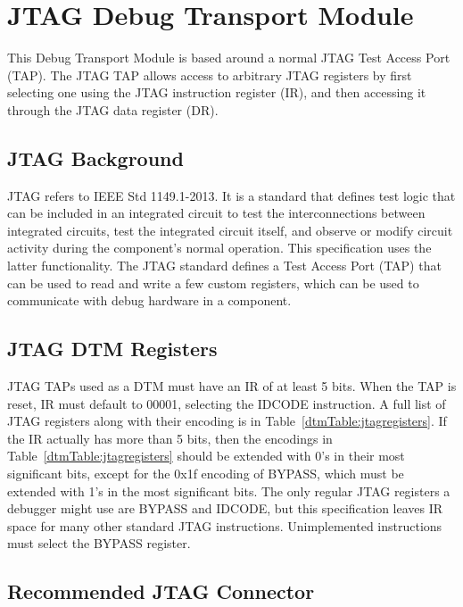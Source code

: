 \section{JTAG Debug Transport Module} \label{sec:jtagdtm}

This Debug Transport Module is based around a normal JTAG Test Access Port
(TAP).  The JTAG TAP allows access to arbitrary JTAG registers by first
selecting one using the JTAG instruction register (IR), and then accessing it
through the JTAG data register (DR).

\subsection{JTAG Background}

JTAG refers to IEEE Std 1149.1-2013. It is a standard that defines test logic
that can be included in an integrated circuit to test the interconnections
between integrated circuits, test the integrated circuit itself, and observe or
modify circuit activity during the component’s normal operation.
This specification uses the latter functionality.
The JTAG standard defines a Test Access Port (TAP) that
can be used to read and write a few custom registers, which can be used to
communicate with debug hardware in a component.

\subsection{JTAG DTM Registers}

JTAG TAPs used as a DTM must have an IR of at least 5 bits.
When the TAP is reset, IR must default to
00001, selecting the IDCODE instruction. A full list of JTAG registers along
with their encoding is in Table~\ref{dtmTable:jtagregisters}.
If the IR actually has more than 5 bits, then the encodings in
Table~\ref{dtmTable:jtagregisters} should be extended with 0's in their most
significant bits, except for the 0x1f encoding of BYPASS, which must be
extended with 1's in the most significant bits.
The only regular JTAG registers a debugger might use are BYPASS and IDCODE, but this
specification leaves IR space for many other standard JTAG instructions.
Unimplemented instructions must select the BYPASS register.



\subsection{Recommended JTAG Connector}

